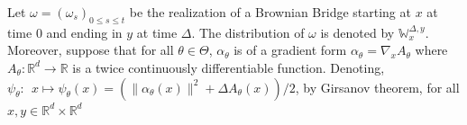 \documentclass{article}
\def\Xset{\mathbb{R}^d}
\newcommand{\md}[1]{g_{#1}}
\newcommand{\parvec}{\theta}
\newcommand{\parspace}{\Theta}
\newcommand{\hd}[1]{q_{#1}}
\newcommand{\hdhat}[1]{\widehat{q}_{#1}}
\def\pE{\mathbb{E}}
\newcommand{\rset}{\ensuremath{\mathbb{R}}}
\newcommand{\rmd}{\ensuremath{\mathrm{d}}}
\newcommand{\eqsp}{\;}
\newcommand{\hatqg}[1]{\mathsf{\ell}_{#1}}
\begin{document}
Let $\omega = (\omega_s)_{0 \leq s \leq t}$ be the realization of a Brownian Bridge starting at $x$ at time 0 and ending in $y$ at time $\Delta$. The distribution of $\omega$ is denoted by  $\mathbb{W}_x^{\Delta,y}$. 
Moreover, suppose that for all $\parvec\in\parspace$, $\alpha_{\parvec}$ is of a gradient form $\alpha_{\parvec} = \nabla_x A_{\parvec}$ where $A_{\parvec}:\Xset \to \rset$ is a twice continuously differentiable function. Denoting, $ \psi_\theta:~~x \mapsto  \psi_\theta(x) = (\|\alpha_{\parvec}(x)\|^2 + \Delta A_{\parvec}(x))/2$, by Girsanov theorem, for all $x, y \in \mathbb{R}^d \times \mathbb{R}^d$
\end{document}
